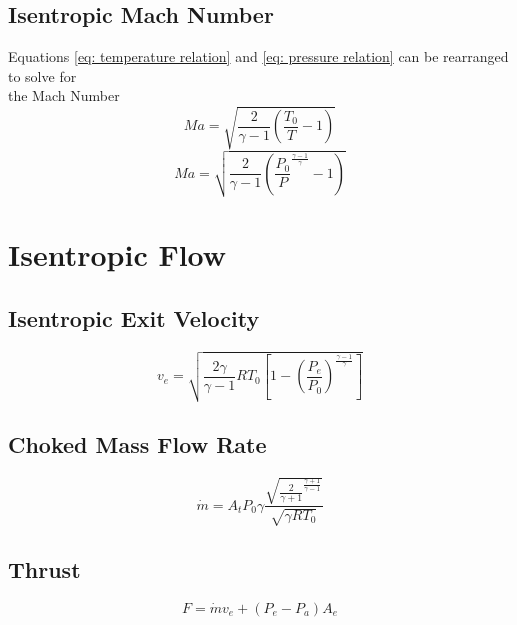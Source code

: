 \documentclass{article}
\numberwithin{equation}{section}
\begin{document}
\subsection{Isentropic Mach Number}
Equations \eqref{eq: temperature relation} and \eqref{eq: pressure relation} can be rearranged to solve for \\
the Mach Number
\begin{equation} \label{1.6a}
    Ma = \sqrt{\frac{2}{\gamma - 1} \left(\frac{T_0}{T} - 1\right)}
\end{equation}
\begin{equation} \label{1.6b}
    Ma = \sqrt{\frac{2}{\gamma - 1} \left(\frac{P_0}{P} ^ {\frac{\gamma - 1}{\gamma}} - 1\right)}
\end{equation}

\pagebreak

\section[Isentropic Flow]{Isentropic Flow\hfil\cite{RPE}}

\subsection{Isentropic Exit Velocity}
\begin{equation} \label{eq: exit velocity}
    v_e = \sqrt{\frac{2 \gamma}{\gamma - 1} R T_0 \left[1 - \left(\frac{P_e}{P_0}\right) ^ {\frac{\gamma - 1}{\gamma}}\right]}
\end{equation}

\subsection{Choked Mass Flow Rate}
\begin{equation} \label{eq: mass flow}
    \dot{m} = A_t P_0 \gamma \frac{\sqrt{\frac{2}{\gamma + 1} ^ {\frac{\gamma + 1}{\gamma - 1}}}}{\sqrt{\gamma R T_0}}
\end{equation}

\subsection{Thrust}
\begin{equation} \label{eq: thrust}
    F = \dot{m} v_e + \left(P_e - P_a\right) A_e
\end{equation}


\pagebreak



\end{document}
